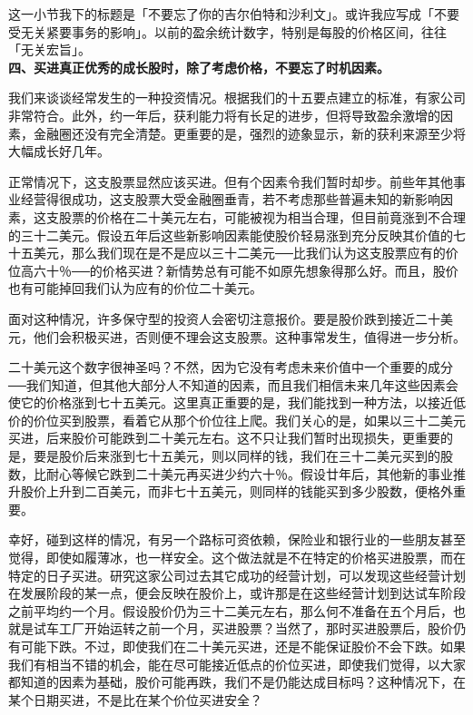 \documentclass[UTF8,a4paper,zihao=-4,fontset = windows]{ctexart} %
\begin{document}
这一小节我下的标题是「不要忘了你的吉尔伯特和沙利文」。或许我应写成「不要受无关紧要事务的影响」。以前的盈余统计数字，特别是每股的价格区间，往往「无关宏旨」。
\\

\textbf{四、买进真正优秀的成长股时，除了考虑价格，不要忘了时机因素。}


我们来谈谈经常发生的一种投资情况。根据我们的十五要点建立的标准，有家公司非常符合。此外，约一年后，获利能力将有长足的进步，但将导致盈余激增的因素，金融圈还没有完全清楚。更重要的是，强烈的迹象显示，新的获利来源至少将大幅成长好几年。

正常情况下，这支股票显然应该买进。但有个因素令我们暂时却步。前些年其他事业经营得很成功，这支股票大受金融圈垂青，若不考虑那些普遍未知的新影响因素，这支股票的价格在二十美元左右，可能被视为相当合理，但目前竟涨到不合理的三十二美元。假设五年后这些新影响因素能使股价轻易涨到充分反映其价值的七十五美元，那么我们现在是不是应以三十二美元──比我们认为这支股票应有的价位高六十％──的价格买进？新情势总有可能不如原先想象得那么好。而且，股价也有可能掉回我们认为应有的价位二十美元。

面对这种情况，许多保守型的投资人会密切注意报价。要是股价跌到接近二十美元，他们会积极买进，否则便不理会这支股票。这种事常发生，值得进一步分析。

二十美元这个数字很神圣吗？不然，因为它没有考虑未来价值中一个重要的成分──我们知道，但其他大部分人不知道的因素，而且我们相信未来几年这些因素会使它的价格涨到七十五美元。这里真正重要的是，我们能找到一种方法，以接近低价的价位买到股票，看着它从那个价位往上爬。我们关心的是，如果以三十二美元买进，后来股价可能跌到二十美元左右。这不只让我们暂时出现损失，更重要的是，要是股价后来涨到七十五美元，则以同样的钱，我们在三十二美元买到的股数，比耐心等候它跌到二十美元再买进少约六十％。假设廿年后，其他新的事业推升股价上升到二百美元，而非七十五美元，则同样的钱能买到多少股数，便格外重要。

幸好，碰到这样的情况，有另一个路标可资依赖，保险业和银行业的一些朋友甚至觉得，即使如履薄冰，也一样安全。这个做法就是不在特定的价格买进股票，而在特定的日子买进。研究这家公司过去其它成功的经营计划，可以发现这些经营计划在发展阶段的某一点，便会反映在股价上，或许那是在这些经营计划到达试车阶段之前平均约一个月。假设股价仍为三十二美元左右，那么何不准备在五个月后，也就是试车工厂开始运转之前一个月，买进股票？当然了，那时买进股票后，股价仍有可能下跌。不过，即使我们在二十美元买进，还是不能保证股价不会下跌。如果我们有相当不错的机会，能在尽可能接近低点的价位买进，即使我们觉得，以大家都知道的因素为基础，股价可能再跌，我们不是仍能达成目标吗？这种情况下，在某个日期买进，不是比在某个价位买进安全？
\end{document}

